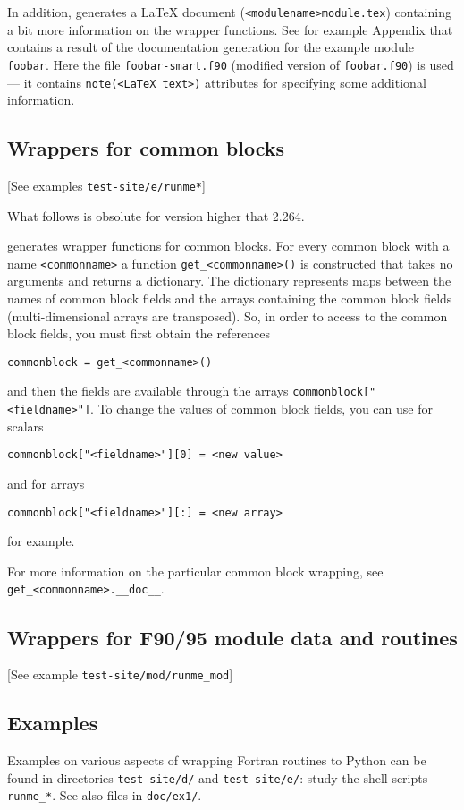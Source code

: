 In addition, \fpy generates a LaTeX document
(\texttt{<modulename>module.tex}) containing a bit more information on
the wrapper functions. See for example Appendix that contains a result
of the documentation generation for the example module
\texttt{foobar}.  Here the file \texttt{foobar-smart.f90} (modified
version of \texttt{foobar.f90}) is used --- it contains
\texttt{note(<LaTeX text>)} attributes for specifying some additional
information.

\subsection{Wrappers for common blocks}
\label{sec:wrapcomblock}

[See examples \texttt{test-site/e/runme*}]

What follows is obsolute for \fpy version higher that 2.264.

\fpy generates wrapper functions for common blocks. For every common
block with a name \texttt{<commonname>} a function
\texttt{get\_<commonname>()} is constructed that takes no arguments
and returns a dictionary. The dictionary represents maps between the
names of common block fields and the arrays containing the common
block fields (multi-dimensional arrays are transposed). So, in order
to access to the common block fields, you must first obtain the
references
\begin{verbatim}
commonblock = get_<commonname>()
\end{verbatim}
and then the fields are available through the arrays
\texttt{commonblock["<fieldname>"]}.
To change the values of common block fields, you can use for scalars
\begin{verbatim}
commonblock["<fieldname>"][0] = <new value>
\end{verbatim}
and for arrays
\begin{verbatim}
commonblock["<fieldname>"][:] = <new array>
\end{verbatim}
for example.

For more  information  on the particular   common block  wrapping, see
\texttt{get\_<commonname>.\_\_doc\_\_}.

\subsection{Wrappers for F90/95 module data and routines}
\label{sec:wrapf90modules}

[See example \texttt{test-site/mod/runme\_mod}]

\subsection{Examples}
\label{sec:examples}

Examples on various aspects of wrapping Fortran routines to Python can
be  found        in   directories      \texttt{test-site/d/}       and
\texttt{test-site/e/}: study  the shell scripts \texttt{runme\_*}. See
also files in \texttt{doc/ex1/}.


